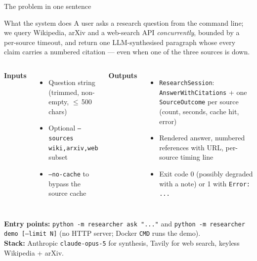 \documentclass[aspectratio=169,11pt]{beamer}
\begin{document}
\begin{frame}{The problem in one sentence}
  \begin{block}{What the system does}
    A user asks a research question from the command line; we query Wikipedia, arXiv and a web-search API \emph{concurrently}, bounded by a per-source timeout, and return one LLM-synthesised paragraph whose every claim carries a numbered citation --- even when one of the three sources is down.
  \end{block}

  \vspace{0.3em}
  \begin{columns}[T,onlytextwidth]
  \textbf{Inputs}
  \begin{itemize}
    \item Question string (trimmed, non-empty, $\le$\,500 chars)
    \item Optional \texttt{--sources wiki,arxiv,web} subset
    \item \texttt{--no-cache} to bypass the source cache
  \end{itemize}

  \textbf{Outputs}
  \begin{itemize}
    \item \texttt{ResearchSession}: \texttt{AnswerWithCitations} + one \texttt{SourceOutcome} per source (count, seconds, cache hit, error)
    \item Rendered answer, numbered references with URL, per-source timing line
    \item Exit code 0 (possibly degraded with a note) or 1 with \texttt{Error: ...}
  \end{itemize}
  \end{columns}

  \vspace{0.4em}
  \textbf{Entry points:} \texttt{python -m researcher ask "..."} and \texttt{python -m researcher demo [--limit N]} (no HTTP server; Docker \texttt{CMD} runs the demo).\\
  \textbf{Stack:} Anthropic \texttt{claude-opus-5} for synthesis, Tavily for web search, keyless Wikipedia + arXiv.
\end{frame}
\end{document}
